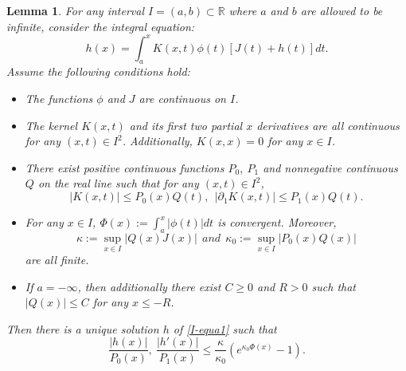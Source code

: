 \documentclass[11pt]{article}
\newtheorem{lemma}[theorem]{Lemma}
\numberwithin{equation}{section}%
\numberwithin{theorem}{section}
\begin{document}
\begin{lemma}\label{intBound}
    For any interval $I=(a,b)\subset\mathbb{R}$ where $a$ and $b$ are allowed to be infinite, consider the integral equation:
    \begin{equation}\label{I-equa1}
h(x)=\int_a^xK(x,t)\phi(t)\left[J(t)+h(t)\right]dt.
    \end{equation}
Assume the following conditions hold:
\begin{itemize}
    \item The functions $\phi$ and $J$ are continuous on $I$.
    \item The kernel $K(x,t)$ and its first two partial $x$ derivatives are all continuous for any $(x,t)\in I^2$. Additionally, $K(x,x)=0$ for any $x\in I$.
    \item There exist positive continuous functions $P_0,~P_1$ and nonnegative continuous $Q$ on the real line such that for any $(x,t)\in I^2$,
    \begin{equation}\label{QPres}
        |K(x,t)|\le P_0(x)Q(t),~~|\partial_1K(x,t)|\le P_1(x)Q(t).
    \end{equation}
    \item For any $x\in I$, $\Phi(x):=\int_a^x|\phi(t)|dt$ is convergent. Moreover, 
    \begin{equation}\label{Cres}
        \kappa:=\sup_{x\in I}|Q(x)J(x)|~~and~~\kappa_0:=\sup_{x\in I}|P_0(x)Q(x)|
    \end{equation} are all finite.
    \item If $a=-\infty$, then additionally there exist $C\ge0$ and $R>0$ such that $|Q(x)|\le C$ for any $x\le-R$.
\end{itemize}
Then there is a unique solution $h$ of \eqref{I-equa1} such that
\begin{equation}\label{expB4h}
    \frac{|h(x)|}{P_0(x)},~\frac{|h'(x)|}{P_1(x)}\le\frac{\kappa}{\kappa_0}\left(e^{\kappa_0\Phi(x)}-1\right).
\end{equation}
\end{lemma}
\end{document}
